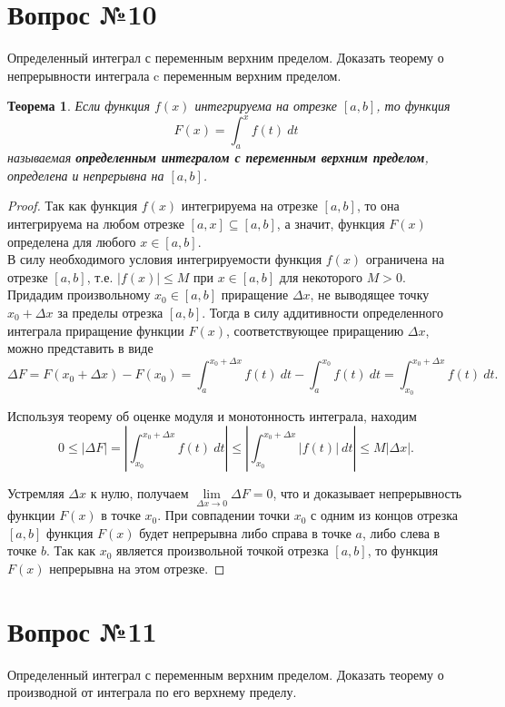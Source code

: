 \documentclass[12pt]{report}
\numberwithin{equation}{section}
\newtheorem{theorem}{Теорема}[section]
\begin{document}
\newpage \section{Вопрос №10} %
\begin{framed}
Определенный интеграл с переменным верхним пределом. Доказать теорему о непрерывности интеграла c переменным верхним пределом.
\end{framed}
\begin{theorem}
Если функция $f(x)$ интегрируема на отрезке $[a,b]$, то функция
\begin{equation} \label{eq:10:1}
F(x) = \int_a^x f(t)~dt
\end{equation}
называемая \textbf{определенным интегралом с переменным верхним пределом}, определена и непрерывна на $[a,b]$.
\end{theorem}
\begin{proof}
Так как функция $f(x)$ интегрируема на отрезке $[a,b]$, то она интегрируема на любом отрезке $[a,x] \subseteq [a,b]$, а значит, функция $F(x)$ определена для любого $x \in [a,b]$.\\

В силу необходимого условия интегрируемости функция $f(x)$ ограничена на отрезке $[a,b]$, т.е. $|f(x)| \leqslant M$ при $x \in [a,b]$ для некоторого $M > 0$. Придадим произвольному $x_0 \in [a,b]$ приращение $\Delta x$, не выводящее точку $x_0 + \Delta x$ за пределы отрезка $[a,b]$. Тогда в силу аддитивности определенного интеграла приращение функции $F(x)$, соответствующее приращению $\Delta x$, можно представить в виде
\[ \Delta F = F(x_0 + \Delta x) - F(x_0) = \int_a^{x_0 + \Delta x} f(t)~dt - \int_a^{x_0} f(t)~dt = \int_{x_0}^{x_0 + \Delta x} f(t)~ dt.\]

Используя теорему об оценке модуля и монотонность интеграла, находим
\[ 0 \leqslant |\Delta F| = \left|\int_{x_0}^{x_0 + \Delta x} f(t)~ dt \right| \leqslant \left|\int_{x_0}^{x_0 + \Delta x} |f(t)|~ dt \right| \leqslant M|\Delta x|.\]

Устремляя $\Delta x$ к нулю, получаем $\lim\limits_{\Delta x \to 0} \Delta F = 0$, что и доказывает непрерывность функции $F(x)$ в точке $x_0$. При совпадении точки $x_0$ с одним из концов отрезка $[a,b]$ функция $F(x)$ будет непрерывна либо справа в точке $a$, либо слева в точке $b$. Так как $x_0$ является произвольной точкой отрезка $[a,b]$, то функция $F(x)$ непрерывна на этом отрезке.
\end{proof}

\newpage \section{Вопрос №11} %
\begin{framed}
Определенный интеграл с переменным верхним пределом. Доказать теорему о производной от интеграла по его верхнему пределу.
\end{framed}
\end{document}
